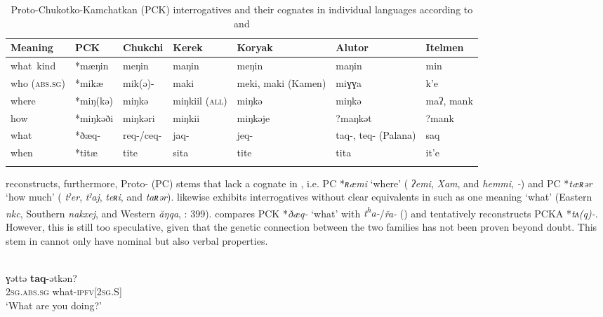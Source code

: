 \begin{table}
\caption{Proto-Chukotko-Kamchatkan (PCK) interrogatives and their cognates in individual languages according to \cite[56, 173, 175ff., 287]{Fortescue2005} and \cite{Dunn1999,Dunn2000}}
\label{tab:chuk:2}

\begin{tabularx}{\textwidth}{QllQQQl}
\lsptoprule
\small
\textbf{Meaning} & \textbf{PCK} & \textbf{Chukchi} & \textbf{Kerek} & \textbf{Koryak} & \textbf{Alutor} & \textbf{Itelmen}\\
\midrule
what~kind & *mæŋin & meŋin & maŋin & meŋin & maŋin & min\\
who (\textsc{abs.sg}) & *mikæ & mik(ə)- & maki & meki, maki (Kamen) & miɣɣa & k’e\\
where & *miŋ(kə) & miŋkə & miŋkiil (\textsc{all}) & miŋkə & miŋkə & maʔ, mank\\
how & *miŋkəði & miŋkəri & miŋkii & miŋkəje & ?maŋkət & ?mank\\
what & *ðæq- & req-/ceq- & jaq- & jeq- & taq-, teq- (Palana) & saq\\
when & *titæ & tite & sita & tite & tita & it’e\\
\lspbottomrule
\end{tabularx}
\end{table}

\cite[263, 282]{Fortescue2005} reconstructs, furthermore, Proto- (PC) stems that lack a cognate in , i.e. PC *\textit{ʀæmi} ‘where’ ( \textit{ʔemi},  \textit{Xam}, and  \textit{hemmi},  \textit{-}) and PC *\textit{tæʀər} ‘how much’ ( \textit{tˀer},  \textit{tˀaj},  \textit{teʀ}\textit{i}, and  \textit{taʀər}).  likewise exhibits interrogatives without clear equivalents in  such as one meaning ‘what’ (Eastern \textit{nkc}, Southern \textit{nakxej}, and Western \textit{ăŋqa}, \citealt{Fortescue2005}: 399). \citet[1372]{Fortescue2011} compares PCK *\textit{ðæq-} ‘what’ with  \textit{t\textsuperscript{h}}\textit{a-}/\textit{řa-} () and tentatively reconstructs PCKA *\textit{tʌ(q)-}. However, this  is still too speculative, given that the genetic connection between the two families has not been proven beyond doubt. This stem in  cannot only have nominal but also verbal properties.

\ea%
    \label{ex:chuk:12}
    \\
    \gll ɣəttə \textbf{{taq}}-ətkən?\\
    2\textsc{sg}.\textsc{abs}.\textsc{sg}  what-\textsc{ipfv[2sg.S]}\\
    \glt ‘What are you doing?’ \citep[294]{Nagayama2011}
    \z

